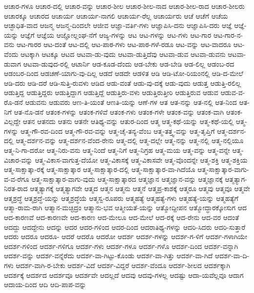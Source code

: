 {ಆಚಾರ-ಗಳೂ
ಆಚಾರ-ದಲ್ಲಿ
ಆಚಾರ-ವನ್ನು
ಆಚಾರ-ಶೀಲ
ಆಚಾರ-ಶೀಲ-ನಾದ
ಆಚಾರ-ಶೀಲ-ರಾದ
ಆಚಾರ-ಶೀಲರು
ಆಚಾರಕ್ಕೂ
ಆಚಾರದ
ಆಚಾರ್ಯ
ಆಚಾರ್ಯ-ನಾಗಲಿ
ಆಚಾರ್ಯ-ರೆಲ್ಲ
ಆಚಾರ್ಯರು
ಆಚೆ
ಆಚೆಗೆ
ಆಚೆಯ
ಆಚ್ಛಾಧಿತ-ವಾದ
ಆಜನ್ಮ
ಆಜನ್ಮ-ದಿಂದಲೇ
ಆಜೀವ
ಆಜ್ಞಾ-ವರ್ತಿ-ಗಳು
ಆಜ್ಞಾಪಿಸಿ-ದನು
ಆಜ್ಞಾಪಿಸಿ-ದರು
ಆಜ್ಞೆ
ಆಜ್ಞೆ-ಯನ್ನು
ಆಜ್ಞೆಗೆ
ಆಜ್ಞೆಯ
ಆಜ್ಞೋಲ್ಲಂಘ-ನೆಗೆ
ಆಜ್ಯ-ಗಳನ್ನು
ಆಟ
ಆಟ-ಗಳನ್ನು
ಆಟ-ಗಳು
ಆಟ-ಗಾರ
ಆಟ-ಗಾರ-ನ-ವನು
ಆಟ-ಗಾರರ
ಆಟ-ದಂತೆ
ಆಟ-ದಲ್ಲಿ
ಆಟ-ಪಾಠ-ಗಳು
ಆಟ-ಪಾಠ-ಗಳೆ-ರಡೂ
ಆಟ-ವನ್ನು
ಆಟ-ವಾದರೂ
ಆಟ-ವೆಂದು
ಆಟಕ್ಕಾಗಿ
ಆಟಕ್ಕೂ
ಆಟದ
ಆಟವಾ-ಡು-ವುದು
ಆಟವಾ-ಡುತ್ತಿದೆವು
ಆಟವಾ-ಡುವ
ಆಟವಾ-ಡುವನು
ಆಟವಾ-ಡುವಾಗ
ಆಟವಾ-ಡುವುದ-ರಲ್ಲಿ
ಆಟಾರ್ನಿ
ಆಡ-ಕೂಡ-ದೆಂದು
ಆಡ-ಬೇಕು
ಆಡ-ಬೇಡಿ
ಆಡ-ಲಿಲ್ಲ
ಆಡಂಬ-ರದ
ಆಡಂಬರ-ದಿಂದ
ಆಡಚಣೆ-ಯಾಗು-ವು-ದಿಲ್ಲ
ಆಡದೆ
ಆಡದೇ
ಆಡಳಿತ
ಆಡಿ
ಆಡಿ-ಟೋ-ರಿಯಂನಲ್ಲಿ
ಆಡಿ-ದ-ಮೇಲೆ
ಆಡಿ-ದರು
ಆಡಿ-ದರೆ
ಆಡಿ-ಸುತ್ತಿ-ರುವಳು
ಆಡಿದ
ಆಡು-ವಂತೆ
ಆಡು-ವು-ದಕ್ಕೆ
ಆಡು-ವುದು
ಆಡುತ್ತ
ಆಡುತ್ತಿ-ರಲಿಲ್ಲ
ಆಡುತ್ತಿದ್ದ
ಆಡುತ್ತಿದ್ದರು
ಆಡುತ್ತಿದ್ದಾಗ
ಆಡುತ್ತಿದ್ದೆ
ಆಡುತ್ತಿರು-ವಳು
ಆಡುತ್ತಿರುತ್ತೀರಿ
ಆಡುತ್ತಿರುವ
ಆಡುವ
ಆಡುವ-ವ-ರೊ-ಡನೆ
ಆಡುವನು
ಆಡುವರು
ಆಣ-ತಿ-ಯಂತೆ
ಆಣತಿ-ಯನ್ನು
ಆಣೆ-ಗಳ
ಆತ
ಆತ-ನನ್ನು
ಆತ-ನಲ್ಲಿ
ಆತ-ನಿಂದ
ಆತ-ನಿಗೆ
ಆತ-ನೊ-ಡನೆ
ಆತಂಕ-ಗಳನ್ನು
ಆತಂಕ-ಗಳಿವೆ
ಆತಂಕ-ಗಳು
ಆತಂಕ-ಗಳೇ
ಆತಂಕ-ವನ್ನು
ಆತಂಕ-ವಾಗಿ
ಆತಂಕ-ವಿಲ್ಲದ್ದೇ
ಆತನ
ಆತನದು
ಆತನು
ಆತನೇ
ಆತಿಥ್ಯ-ವನ್ನು
ಆತುರ-ದಿಂದ
ಆತ್ಮ
ಆತ್ಮ-ಕಥೆ-ಯನ್ನು
ಆತ್ಮ-ಕಥೆ-ಯಲ್ಲಿ
ಆತ್ಮ-ಗಳನ್ನು
ಆತ್ಮ-ಗೌ-ರವ-ದಿಂದ
ಆತ್ಮ-ಗೌ-ರವ-ವನ್ನು
ಆತ್ಮ-ಚೈ-ತನ್ಯ-ವೆಂಬ
ಆತ್ಮ-ತತ್ತ್ವ-ವನ್ನು
ಆತ್ಮ-ತೃಪ್ತಿಗೆ
ಆತ್ಮ-ದರ್ಶನ-ದಲ್ಲಿ
ಆತ್ಮ-ದರ್ಶನ-ವನ್ನು
ಆತ್ಮ-ದರ್ಶನ-ವೆಂದ-ರೇನು
ಆತ್ಮ-ದಲ್ಲಿ
ಆತ್ಮ-ದಲ್ಲೇ
ಆತ್ಮ-ನನ್ನು
ಆತ್ಮ-ನಲ್ಲಿ
ಆತ್ಮ-ನಲ್ಲಿಯೂ
ಆತ್ಮ-ನಿ-ಗಾ-ದರೋ
ಆತ್ಮ-ನಿರು-ವನು
ಆತ್ಮ-ನಿಂದೆ
ಆತ್ಮ-ನಿಗೆ
ಆತ್ಮ-ನಿಗ್ರಹ
ಆತ್ಮ-ಮಯ
ಆತ್ಮ-ವನ್ನು
ಆತ್ಮ-ವನ್ನೇ
ಆತ್ಮ-ವಿಚಾರ-ವನ್ನು
ಆತ್ಮ-ವಿಕಾಸ-ವಾಗುತ್ತ-ದೆಯೋ
ಆತ್ಮ-ವಿಕಾಸಕ್ಕೆ
ಆತ್ಮ-ವಿಕಾಸವೇ
ಆತ್ಮ-ವೊಂದನ್ನೇ
ಆತ್ಮ-ಶಕ್ತಿ
ಆತ್ಮ-ಶಕ್ತಿಯ
ಆತ್ಮ-ಸಾಕ್ಷಾತ್ಕಾ-ರಕ್ಕೆ
ಆತ್ಮ-ಸಾಕ್ಷಾತ್ಕಾರ
ಆತ್ಮ-ಸಾಕ್ಷಾತ್ಕಾರ-ದಲ್ಲಿ
ಆತ್ಮ-ಸಾಕ್ಷಾತ್ಕಾರ-ವಾ-ಗಿದೆಯೊ
ಆತ್ಮ-ಸಾಕ್ಷಾತ್ಕಾರ-ವಾಗು-ವ-ವ-ರೆಗೂ
ಆತ್ಮ-ಸಾಕ್ಷಾತ್ಕಾರ-ವಾಗು-ವುದು
ಆತ್ಮ-ಸಾಕ್ಷಾತ್ಕಾರದ
ಆತ್ಮಜ್ಞಾನ
ಆತ್ಮಜ್ಞಾನ-ವನ್ನು
ಆತ್ಮಜ್ಞಾನಕ್ಕೆ
ಆತ್ಮತ್ಯಾಗ-ನಿರತ-ರಾದ
ಆತ್ಮತ್ಯಾಗಕ್ಕೆ
ಆತ್ಮತ್ಯಾಗವೇ
ಆತ್ಮದ
ಆತ್ಮನ
ಆತ್ಮನು
ಆತ್ಮನೆ
ಆತ್ಮಪ್ರ-ಕಾಶಕ್ಕೆ
ಆತ್ಮರೂ
ಆತ್ಮವು
ಆತ್ಮವೂ
ಆತ್ಮವೇ
ಆತ್ಮಶ್ರದ್ಧೆ
ಆತ್ಮಶ್ರದ್ಧೆ-ಯನ್ನು
ಆತ್ಮಶ್ರದ್ಧೆಯೆ
ಆತ್ಮಸ್ವ-ರೂಪರು
ಆತ್ಮಹತ್ಯೆ
ಆತ್ಮಹತ್ಯೆ-ಗಳು
ಆತ್ಮಹತ್ಯೆ-ಯನ್ನು
ಆತ್ಮಹತ್ಯೆಗೆ
ಆತ್ಮಾ-ರಾಮ-ರಾಗಿ
ಆತ್ಮಾನ-ಮಚ್ಛಿದ್ರಂ
ಆತ್ಮಾನು-ಭವ
ಆತ್ಮೀಯತೆ-ಯನ್ನು
ಆತ್ಮೋದ್ದೀಪನ
ಆತ್ಮೋದ್ಧಾರಕ್ಕೋಸುಗ
ಆದ
ಆದ-ಕಾರಣವೆ
ಆದ-ಕಾರಣವೇ
ಆದ-ಕಾರಣ
ಆದ-ಮೇಲೂ
ಆದ-ಮೇಲೆ
ಆದ-ರಕ್ಕೆ
ಆದ-ರೇನು
ಆದ-ವರ
ಆದಂತೆ
ಆದದ್ದು
ಆದದ್ದೇನು
ಆದನ್ನು
ಆದರ
ಆದರ-ಗಳಿಂದ
ಆದರ-ದಿಂದ
ಆದರಾತಿಥ್ಯ-ಗಳನ್ನು
ಆದರಿ-ಸಿದರು
ಆದರಿ-ಸುತ್ತಾರೆ
ಆದರು
ಆದರೂ
ಆದರೂ-
ಆದರೆ
ಆದರೊ
ಆದರೋ
ಆದರ್ಶ
ಆದರ್ಶ-ಗಳನ್ನು
ಆದರ್ಶ-ಗ-ಳಿಗೆ
ಆದರ್ಶ-ಗಳಾಗಿಯೇ
ಆದರ್ಶ-ಗಳಿಂದ
ಆದರ್ಶ-ಗಳಿಗೂ
ಆದರ್ಶ-ಗಳು
ಆದರ್ಶ-ಗಳೂ
ಆದರ್ಶ-ಗಳೊ
ಆದರ್ಶ-ದಿಂದ
ಆದರ್ಶ-ವನ್ನಾಗಿ
ಆದರ್ಶ-ವನ್ನು
ಆದರ್ಶ-ವನ್ನೆರೆದು
ಆದರ್ಶ-ವಾ-ಗಿಟ್ಟು-ಕೊಂಡು
ಆದರ್ಶ-ವಾ-ಗಿತ್ತು
ಆದರ್ಶ-ವಾ-ಗಿದೆ
ಆದರ್ಶ-ವಾ-ದಿ-ಗಳು
ಆದರ್ಶ-ವಾಗಿ-ರ-ಬೇಕು
ಆದರ್ಶ-ವಿದೆ
ಆದರ್ಶ-ವಿದ್ದರೆ
ಆದರ್ಶ-ವೆಂದೂ
ಆದರ್ಶ-ಶೀಲದ
ಆದರ್ಶಕ್ಕಾಗಿ
ಆದರ್ಶಕ್ಕೆ
ಆದರ್ಶದ
ಆದರ್ಶವೂ
ಆದರ್ಶವೇ
ಆದಲ್ಲದೆ
ಆದವು
ಆದವು-ಗಳಲ್ಲ
ಆದಷ್ಟು
ಆದಾ-ಯವೆಲ್ಲವೂ
ಆದಾಗ
ಆದಾಯ-ದಿಂದ
ಆದಿ
ಆದಿ-ಪಾಪ-ವನ್ನು
}
